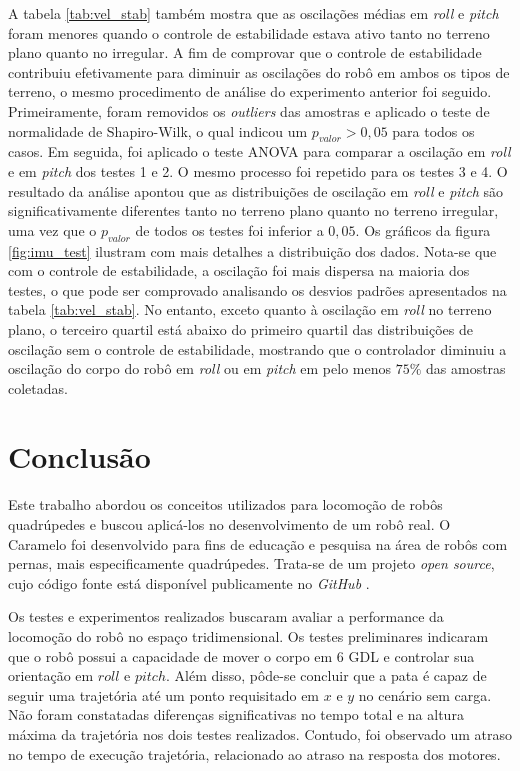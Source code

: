 \documentclass[conference]{IEEEtran}
\begin{document}
  A tabela \ref{tab:vel_stab} também mostra que as oscilações médias em \textit{roll} e \textit{pitch} foram menores quando o controle de estabilidade estava ativo tanto no terreno plano quanto no irregular. A fim de comprovar que o controle de estabilidade contribuiu efetivamente para diminuir as oscilações do robô em ambos os tipos de terreno, o mesmo procedimento de análise do experimento anterior foi seguido. Primeiramente, foram removidos os \textit{outliers} das amostras e aplicado o teste de normalidade de Shapiro-Wilk, o qual indicou um $p_{valor} > 0,05$ para todos os casos. Em seguida, foi aplicado o teste ANOVA para comparar a oscilação em \textit{roll} e em \textit{pitch} dos testes 1 e 2. O mesmo processo foi repetido para os testes 3 e 4. O resultado da análise apontou que as distribuições de oscilação em \textit{roll} e \textit{pitch} são significativamente diferentes tanto no terreno plano quanto no terreno irregular, uma vez que o $p_{valor}$ de todos os testes foi inferior a $0,05$. Os gráficos da figura \ref{fig:imu_test} ilustram com mais detalhes a distribuição dos dados. Nota-se que com o controle de estabilidade, a oscilação foi mais dispersa na maioria dos testes, o que pode ser comprovado analisando os desvios padrões apresentados na tabela \ref{tab:vel_stab}. No entanto, exceto quanto à oscilação em \textit{roll} no terreno plano, o terceiro quartil está abaixo do primeiro quartil das distribuições de oscilação sem o controle de estabilidade, mostrando que o controlador diminuiu a oscilação do corpo do robô em \textit{roll} ou em \textit{pitch} em pelo menos $75\%$ das amostras coletadas.


\section{Conclusão}

Este trabalho abordou os conceitos utilizados para locomoção de robôs quadrúpedes e buscou aplicá-los no desenvolvimento de um robô real. O Caramelo foi desenvolvido para fins de educação e pesquisa na área de robôs com pernas, mais especificamente quadrúpedes. Trata-se de um projeto \textit{open source}, cujo código fonte está disponível publicamente no \textit{GitHub} \cite{CaramelRepo}. 
  
Os testes e experimentos realizados buscaram avaliar a performance da locomoção do robô no espaço tridimensional. Os testes preliminares indicaram que o robô possui a capacidade de mover o corpo em 6 GDL e controlar sua orientação em $roll$ e $pitch$. Além disso, pôde-se concluir que a pata é capaz de seguir uma trajetória até um ponto requisitado em $x$ e $y$ no cenário sem carga. Não foram constatadas diferenças significativas no tempo total e na altura máxima da trajetória nos dois testes realizados. Contudo, foi observado um atraso no tempo de execução trajetória, relacionado ao atraso na resposta dos motores.
 
\end{document}
